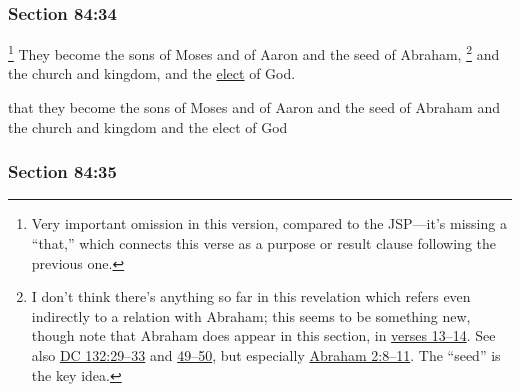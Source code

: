 	\subsubsection{Section 84:34} %
		\label{DC84-34}

			\footnote{%
				Very important omission in this version, compared to the JSP---it's missing a ``that,'' which connects this verse as a purpose or result clause following the previous one.
				}%
		They become the sons of Moses and of Aaron and the seed of Abraham,%
			\footnote{%
				I don't think there's anything so far in this revelation which refers even indirectly to a relation with Abraham; this seems to be something new, though note that Abraham does appear in this section, in \hyperref[DC84-13]{verses 13--14}. See also \hyperref[DC132-29]{DC 132:29--33} and \hyperref[DC132-49]{49--50}, but especially \hyperref[ABRAHAM-2-8]{Abraham 2:8--11}. The ``seed'' is the key idea.
				}
		and the church and kingdom, and the \hyperref[ELECTION]{elect} of God.

		\begin{framed}
		\scriptsize
			\begin{compactdesc}
				\item[JSP] that they become the sons of Moses and of Aaron and the seed of Abraham and the church and kingdom and the elect of God
			\end{compactdesc}
		\end{framed}

	\subsubsection{Section 84:35} %
		\label{DC84-35}

